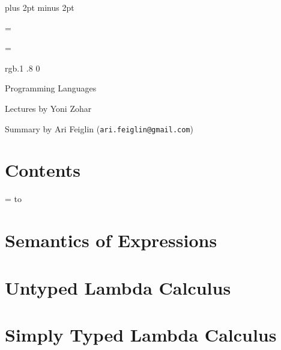 


\parindent=0pt
\parskip=3pt plus 2pt minus 2pt



\footline={}


\headline={}

\color rgb{.1 .8 0}

{\def\boxshadowcolor{rgb{.2 .9 .2}}

    \centerline{Programming Languages}
    \smallskip
    \centerline{Lectures by Yoni Zohar}
    \centerline{Summary by Ari Feiglin ({\tt ari.feiglin@gmail.com})}

\eppbox

\bigskip

\section*{Contents}

\tableofcontents
\eppbox

}

\vfill\break

\color{black}

\newif\ifpageodd
\pageoddtrue
\headline={%
    \hbox to \hsize{\color{black}%
        \ifpageodd\hfil{\it\currsubsection\quad\bf\folio}\global\pageoddfalse%
        \else{\bf\folio\quad\it\currsubsection}\hfil\global\pageoddtrue\fi%
    }%
}

\section{Semantics of Expressions}



\vfill\break

\section{Untyped Lambda Calculus}



\vfill\break

\section{Simply Typed Lambda Calculus}



\bye

